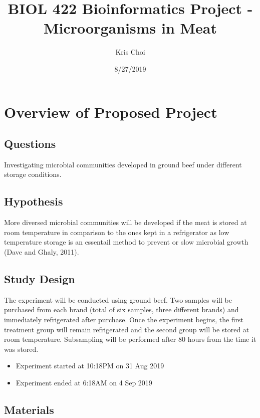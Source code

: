 \documentclass[]{article}
\title{BIOL 422 Bioinformatics Project - Microorganisms in Meat}
\author{Kris Choi}
\date{8/27/2019}
\providecommand{\tightlist}{%
  \setlength{\itemsep}{0pt}\setlength{\parskip}{0pt}}
\begin{document}
\maketitle

\hypertarget{overview-of-proposed-project}{%
\section{Overview of Proposed
Project}\label{overview-of-proposed-project}}

\hypertarget{questions}{%
\subsection{Questions}\label{questions}}

Investigating microbial communities developed in ground beef under
different storage conditions.

\hypertarget{hypothesis}{%
\subsection{Hypothesis}\label{hypothesis}}

More diversed microbial communities will be developed if the meat is
stored at room temperature in comparison to the ones kept in a
refrigerator as low temperature storage is an essentail method to
prevent or slow microbial growth (Dave and Ghaly, 2011).

\hypertarget{study-design}{%
\subsection{Study Design}\label{study-design}}

The experiment will be conducted using ground beef. Two samples will be
purchased from each brand (total of six samples, three different brands)
and immediately refrigerated after purchase. Once the experiment begins,
the first treatment group will remain refrigerated and the second group
will be stored at room temperature. Subsampling will be performed after
80 hours from the time it was stored.

\begin{itemize}
\tightlist
\item
  Experiment started at 10:18PM on 31 Aug 2019
\item
  Experiment ended at 6:18AM on 4 Sep 2019
\end{itemize}

\hypertarget{materials}{%
\subsection{Materials}\label{materials}}
\end{document}
